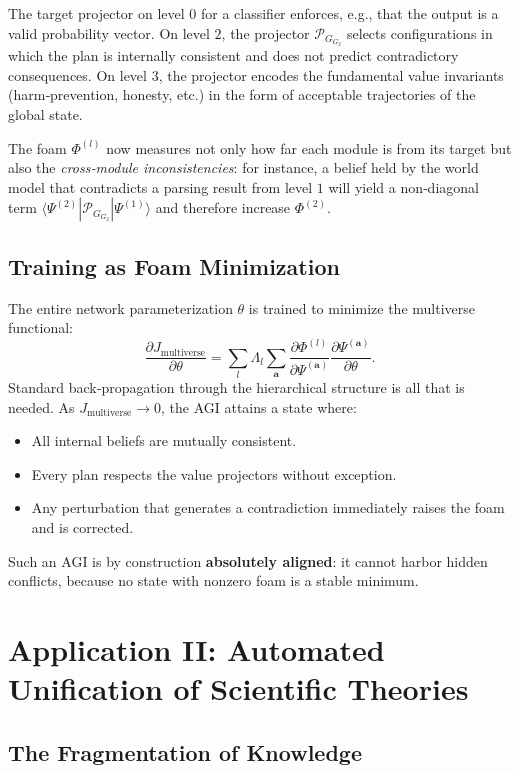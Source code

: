 \documentclass[11pt,a4paper]{article}
\theoremstyle{definition}
\newcommand{\pG}{\mathcal{P}_{\!G}}
\newcommand{\Foam}{\Phi}
\newcommand{\Jfunc}{J_{\text{multiverse}}}
\begin{document}
The target projector on level $0$ for a classifier enforces, e.g., that the output is a valid probability vector. On level $2$, the projector $\pG_{G_2}$ selects configurations in which the plan is internally consistent and does not predict contradictory consequences. On level $3$, the projector encodes the fundamental value invariants (harm‑prevention, honesty, etc.) in the form of acceptable trajectories of the global state.

The foam $\Foam^{(l)}$ now measures not only how far each module is from its target but also the \emph{cross‑module inconsistencies}: for instance, a belief held by the world model that contradicts a parsing result from level $1$ will yield a non‑diagonal term $\langle \Psi^{(2)}|\pG_{G_2}|\Psi^{(1)}\rangle$ and therefore increase $\Foam^{(2)}$.

\subsection{Training as Foam Minimization}

The entire network parameterization $\theta$ is trained to minimize the multiverse functional:
\[
\frac{\partial \Jfunc}{\partial \theta} = \sum_{l} \Lambda_l \sum_{\mathbf{a}} \frac{\partial \Foam^{(l)}}{\partial \Psi^{(\mathbf{a})}} \frac{\partial \Psi^{(\mathbf{a})}}{\partial \theta}.
\]
Standard back‑propagation through the hierarchical structure is all that is needed. As $\Jfunc \to 0$, the AGI attains a state where:
\begin{itemize}
    \item All internal beliefs are mutually consistent.
    \item Every plan respects the value projectors without exception.
    \item Any perturbation that generates a contradiction immediately raises the foam and is corrected.
\end{itemize}
Such an AGI is by construction \textbf{absolutely aligned}: it cannot harbor hidden conflicts, because no state with nonzero foam is a stable minimum.

\section{Application II: Automated Unification of Scientific Theories}

\subsection{The Fragmentation of Knowledge}
\end{document}
